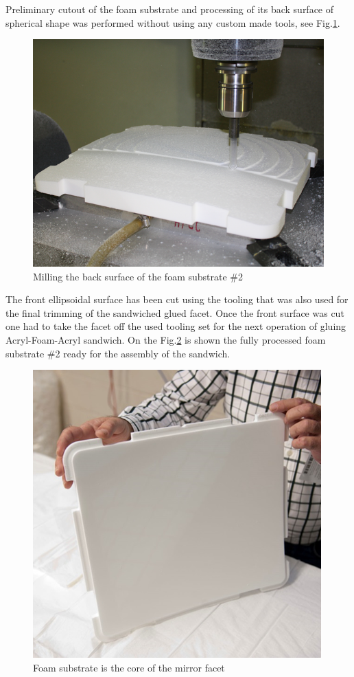 Preliminary cutout of the foam substrate and processing of its back surface of spherical shape was performed without using any custom made tools, see Fig.\ref{fig:Cut_Substr}.
\begin{figure}[h]
    \centering
    \includegraphics[width=0.9\linewidth]{Cut_Substr.png}
    \caption{Milling the back surface of the foam substrate \#2}
    \label{fig:Cut_Substr}
\end{figure}{}

The front ellipsoidal surface has been cut using the tooling that was also used for the final trimming of the sandwiched glued facet. Once the front surface was cut one had to take the facet off the used tooling set for the next operation of gluing Acryl-Foam-Acryl sandwich. On the Fig.\ref{fig:Foam_Sub} is shown the fully processed foam substrate \#2 ready for the assembly of the sandwich. 
\begin{figure}[h]
    \centering
    \includegraphics[width=0.9\linewidth]{Foam_Sub.png}
    \caption{Foam substrate is the core of the mirror facet}
    \label{fig:Foam_Sub}
\end{figure}{}

